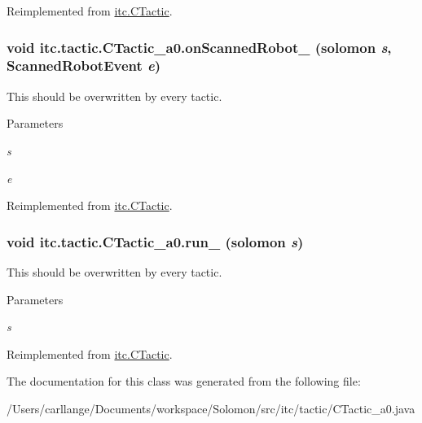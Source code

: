 Reimplemented from \hyperlink{classitc_1_1_c_tactic_a9a8d125f826667459758f2767c3bd957}{itc.CTactic}.\hypertarget{classitc_1_1tactic_1_1_c_tactic__a0_aea5ad2191ee16822a129eafb37d91779}{
\subsubsection[{onScannedRobot\_\-}]{\setlength{\rightskip}{0pt plus 5cm}void itc.tactic.CTactic\_\-a0.onScannedRobot\_\- ({\bf solomon} {\em s}, \/  ScannedRobotEvent {\em e})}}
\label{classitc_1_1tactic_1_1_c_tactic__a0_aea5ad2191ee16822a129eafb37d91779}
This should be overwritten by every tactic. 
\begin{DoxyParams}{Parameters}
\item[{\em s}]\item[{\em e}]\end{DoxyParams}


Reimplemented from \hyperlink{classitc_1_1_c_tactic_a63a5a64ff30293061e37eca71fb77a96}{itc.CTactic}.\hypertarget{classitc_1_1tactic_1_1_c_tactic__a0_a7d6f39924f332a7ed8c53820a45d3834}{
\subsubsection[{run\_\-}]{\setlength{\rightskip}{0pt plus 5cm}void itc.tactic.CTactic\_\-a0.run\_\- ({\bf solomon} {\em s})}}
\label{classitc_1_1tactic_1_1_c_tactic__a0_a7d6f39924f332a7ed8c53820a45d3834}
This should be overwritten by every tactic. 
\begin{DoxyParams}{Parameters}
\item[{\em s}]\end{DoxyParams}


Reimplemented from \hyperlink{classitc_1_1_c_tactic_ae5f5c51a6e04d22bc298dbdec4080770}{itc.CTactic}.

The documentation for this class was generated from the following file:\begin{DoxyCompactItemize}
\item 
/Users/carllange/Documents/workspace/Solomon/src/itc/tactic/CTactic\_\-a0.java\end{DoxyCompactItemize}
